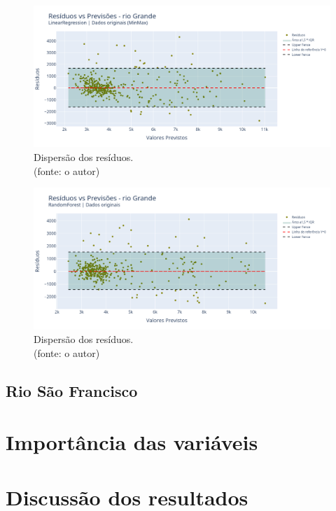 \begin{figure}[!h]
\centering
\includegraphics[scale=0.33]{Figuras/rio_grande/wfv/LR/LR_WFV_ORIG_RESID_x_PREV.png}
\caption{Dispersão dos resíduos.\\(fonte: o autor)}
\label{fig:grande_LR_WFV_ORIG_RESID_x_PREV}
\end{figure}

\begin{figure}[!h]
\centering
\includegraphics[scale=0.33]{Figuras/rio_grande/wfv/RF/RF_WFV_ORIG_RESID_x_PREV.png}
\caption{Dispersão dos resíduos.\\(fonte: o autor)}
\label{fig:grande_RF_WFV_ORIG_RESID_x_PREV}
\end{figure}
\clearpage


\subsection{Rio São Francisco}

\section{Importância das variáveis}

\section{Discuss\~ao dos resultados}
